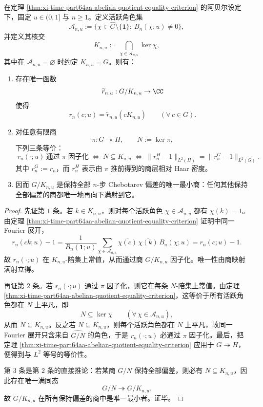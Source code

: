 \begin{theorem}[有限阿贝尔标签系统存在唯一最小偏差承载商]\label{thm:xi-time-part64aa-abelian-minimal-deviation-carrier-quotient}
在定理 \ref{thm:xi-time-part64aa-abelian-quotient-equality-criterion} 的阿贝尔设定下，固定 \(u\in(0,1]\) 与 \(n\ge 1\)。定义活跃角色集
\[
\mathcal A_{n,u}
:=
\{\chi\in \widehat G\setminus\{\mathbf 1\}:\ B_n(\chi;u)\neq 0\},
\]
并定义其核交
\[
K_{n,u}
:=
\bigcap_{\chi\in \mathcal A_{n,u}}\ker\chi,
\]
其中在 \(\mathcal A_{n,u}=\varnothing\) 时约定 \(K_{n,u}=G\)。则有：
\begin{enumerate}
  \item 存在唯一函数
  \[
  \widetilde r_{n,u}:G/K_{n,u}\to \CC
  \]
  使得
  \[
  \boxed{\;
  r_n(c;u)=\widetilde r_{n,u}(cK_{n,u})
  \qquad(\forall\,c\in G).\;}
  \]
  \item 对任意有限商
  \[
  \pi:G\twoheadrightarrow H,
  \qquad
  N:=\ker\pi,
  \]
  下列三条等价：
  \[
  \boxed{\;
  r_n(\cdot;u)\ \text{通过 }\pi\text{ 因子化}\;}
  \iff
  \boxed{\;
  N\subseteq K_{n,u}\;}
  \iff
  \boxed{\;
  \|r_n^{H}-1\|_{L^2(H)}
  =
  \|r_n^{G}-1\|_{L^2(G)}.\;}
  \]
  其中 \(r_n^{G}:=r_n\)，而 \(r_n^{H}\) 表示由 \(\pi\) 推前得到的商层相对 Haar 密度。
  \item 因而 \(G/K_{n,u}\) 是保持全部 \(n\)-步 Chebotarev 偏差的唯一最小商：任何其他保持全部偏差的商都唯一地再向下满射到它。
\end{enumerate}
\end{theorem}
\begin{proof}
先证第 \(1\) 条。若 \(k\in K_{n,u}\)，则对每个活跃角色 \(\chi\in\mathcal A_{n,u}\) 都有 \(\chi(k)=1\)。由定理 \ref{thm:xi-time-part64aa-abelian-quotient-equality-criterion} 证明中同一 Fourier 展开，
\[
r_n(ck;u)-1
=
\frac{1}{B_n(\mathbf 1;u)}
\sum_{\chi\in\mathcal A_{n,u}}
\overline{\chi(c)}\,\overline{\chi(k)}\,B_n(\chi;u)
=
r_n(c;u)-1.
\]
故 \(r_n(\cdot;u)\) 在 \(K_{n,u}\)-陪集上常值，从而通过商 \(G/K_{n,u}\) 因子化。唯一性由商映射满射立得。

再证第 \(2\) 条。若 \(r_n(\cdot;u)\) 通过 \(\pi\) 因子化，则它在每条 \(N\)-陪集上常值。由定理 \ref{thm:xi-time-part64aa-abelian-quotient-equality-criterion}，这等价于所有活跃角色都在 \(N\) 上平凡，即
\[
N\subseteq \ker\chi
\qquad
(\forall\,\chi\in\mathcal A_{n,u}),
\]
从而 \(N\subseteq K_{n,u}\)。反之若 \(N\subseteq K_{n,u}\)，则每个活跃角色都在 \(N\) 上平凡，故同一 Fourier 展开只含来自 \(\widehat{G/N}\) 的角色，于是 \(r_n(\cdot;u)\) 必通过 \(\pi\) 因子化。最后，把定理 \ref{thm:xi-time-part64aa-abelian-quotient-equality-criterion} 应用于 \(G\twoheadrightarrow H\)，便得到与 \(L^2\) 等号的等价性。

第 \(3\) 条是第 \(2\) 条的直接推论：若某商 \(G/N\) 保持全部偏差，则必有 \(N\subseteq K_{n,u}\)，因此存在唯一满同态
\[
G/N\twoheadrightarrow G/K_{n,u}.
\]
故 \(G/K_{n,u}\) 在所有保持偏差的商中是唯一最小者。证毕。
\end{proof}

